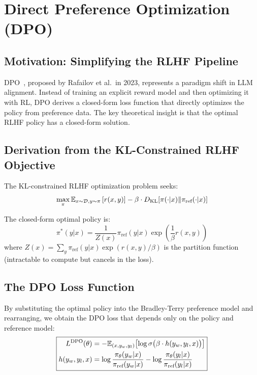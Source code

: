 \section{Direct Preference Optimization (DPO)}
\label{sec:dpo}

\subsection{Motivation: Simplifying the RLHF Pipeline}

DPO~\cite{rafailov2023dpo}, proposed by Rafailov et al.\ in 2023, represents a paradigm shift in LLM alignment. Instead of training an explicit reward model and then optimizing it with RL, DPO derives a closed-form loss function that directly optimizes the policy from preference data. The key theoretical insight is that the optimal RLHF policy has a closed-form solution.

\subsection{Derivation from the KL-Constrained RLHF Objective}

The KL-constrained RLHF optimization problem seeks:
\begin{equation}
\max_\pi \mathbb{E}_{x \sim \mathcal{D}, y \sim \pi}\left[r(x,y)\right] - \beta \cdot D_{\text{KL}}\!\left[\pi(\cdot|x) \| \pi_{\text{ref}}(\cdot|x)\right]
\end{equation}

The closed-form optimal policy is:
\begin{equation}
\pi^*(y|x) = \frac{1}{Z(x)}\pi_{\text{ref}}(y|x)\exp\!\left(\frac{1}{\beta}r(x,y)\right)
\end{equation}
where $Z(x) = \sum_y \pi_{\text{ref}}(y|x)\exp(r(x,y)/\beta)$ is the partition function (intractable to compute but cancels in the loss).

\subsection{The DPO Loss Function}

By substituting the optimal policy into the Bradley-Terry preference model and rearranging, we obtain the DPO loss that depends only on the policy and reference model:
\begin{equation}
\boxed{
\begin{aligned}
L^{\text{DPO}}(\theta) &= -\mathbb{E}_{(x,y_w,y_l)}\bigl[\log\sigma\bigl(\beta\cdot h(y_w,y_l,x)\bigr)\bigr] \\
h(y_w,y_l,x) &= \log\frac{\pi_\theta(y_w|x)}{\pi_{\text{ref}}(y_w|x)} - \log\frac{\pi_\theta(y_l|x)}{\pi_{\text{ref}}(y_l|x)}
\end{aligned}
}
\label{eq:dpo}
\end{equation}

